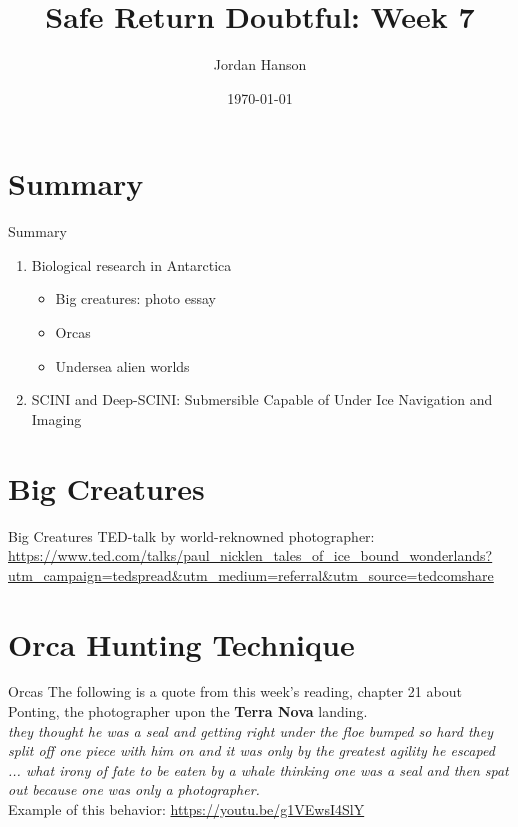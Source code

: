 \documentclass{beamer}
\title{Safe Return Doubtful: Week 7}
\date{\today}
\author{Jordan Hanson}
\institute{Whittier College Department of Physics and Astronomy}
\begin{document}
\maketitle

\section{Summary}

\begin{frame}{Summary}
\begin{enumerate}
\item Biological research in Antarctica
\begin{itemize}
\item Big creatures: photo essay
\item Orcas
\item Undersea alien worlds
\end{itemize}
\item SCINI and Deep-SCINI: Submersible Capable of Under Ice Navigation and Imaging
\end{enumerate}
\end{frame}

\section{Big Creatures}

\begin{frame}{Big Creatures}
TED-talk by world-reknowned photographer: \\ \vspace{1cm}
\url{https://www.ted.com/talks/paul_nicklen_tales_of_ice_bound_wonderlands?utm_campaign=tedspread&utm_medium=referral&utm_source=tedcomshare}
\end{frame}

\section{Orca Hunting Technique}

\begin{frame}{Orcas}
The following is a quote from this week's reading, chapter 21 about Ponting, the photographer upon the \textbf{Terra Nova} landing. \\ \vspace{0.5cm}
\textit{they thought he was a seal and getting right under the floe bumped so hard they split off one piece with him on and it was only by the greatest agility he escaped ... what irony of fate to be eaten by a whale thinking one was a seal and then spat out because one was only a photographer.} \\ \vspace{0.5cm}
Example of this behavior: \url{https://youtu.be/g1VEwsI4SlY}
\end{frame}
\end{document}
